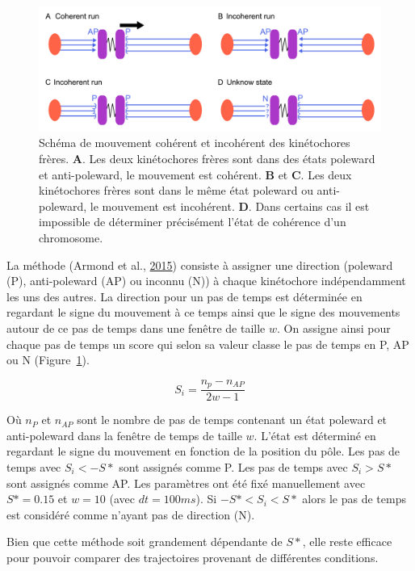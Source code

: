 \documentclass[12pt,a4paper,twoside,openright]{book}
\begin{document}
\begin{figure}[htbp]
\centering
\includegraphics{figures/results/imaging/coherence_schema.png}
\caption[Schéma de mouvement cohérent et incohérent des kinétochores frères.]{\label{fig:coherence_schema}Schéma
de mouvement cohérent et incohérent des kinétochores frères. \textbf{A}.
Les deux kinétochores frères sont dans des états poleward et
anti-poleward, le mouvement est cohérent. \textbf{B} et \textbf{C}. Les
deux kinétochores frères sont dans le même état poleward ou
anti-poleward, le mouvement est incohérent. \textbf{D}. Dans certains
cas il est impossible de déterminer précisément l'état de cohérence d'un
chromosome.}
\end{figure}

La méthode (Armond et al., \protect\hyperlink{ref-Armond2015}{2015})
consiste à assigner une direction (poleward (P), anti-poleward (AP) ou
inconnu (N)) à chaque kinétochore indépendamment les uns des autres. La
direction pour un pas de temps est déterminée en regardant le signe du
mouvement à ce temps ainsi que le signe des mouvements autour de ce pas
de temps dans une fenêtre de taille \(w\). On assigne ainsi pour chaque
pas de temps un score qui selon sa valeur classe le pas de temps en P,
AP ou N (Figure~\ref{fig:coherence_schema}).

\[
S_i = \frac{n_p - n_{AP}}{2w - 1}
\]

Où \(n_P\) et \(n_{AP}\) sont le nombre de pas de temps contenant un
état poleward et anti-poleward dans la fenêtre de temps de taille \(w\).
L'état est déterminé en regardant le signe du mouvement en fonction de
la position du pôle. Les pas de temps avec \(S_i < -S*\) sont assignés
comme P. Les pas de temps avec \(S_i > S*\) sont assignés comme AP. Les
paramètres ont été fixé manuellement avec \(S* = 0.15\) et \(w = 10\)
(avec \(dt=100ms\)). Si \(-S* < S_i < S*\) alors le pas de temps est
considéré comme n'ayant pas de direction (N).

Bien que cette méthode soit grandement dépendante de \(S*\), elle reste
efficace pour pouvoir comparer des trajectoires provenant de différentes
conditions.
\end{document}
